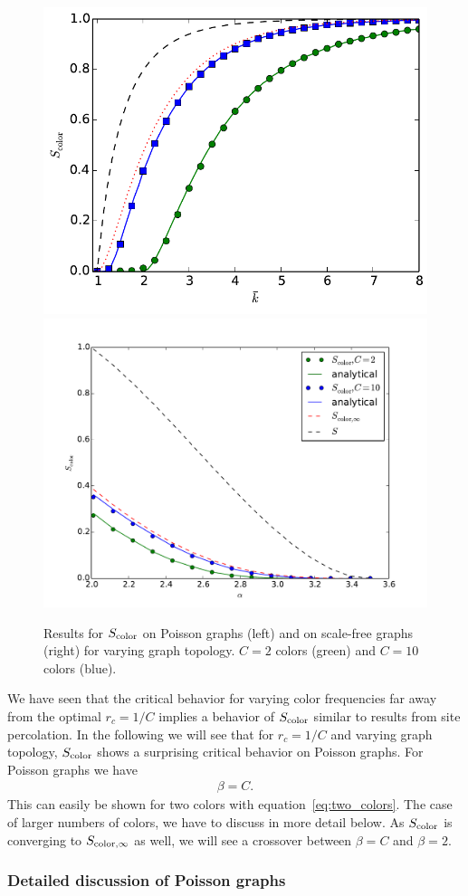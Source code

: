 \documentclass[aps, pre, onecolumn, a4paper, floatfix]{revtex4}
\begin{document}
\begin{figure}[htb]
    \includegraphics[width=0.45\columnwidth]{S_color_poisson.pdf}
    \includegraphics[width=0.53\columnwidth]{S_color_broad.pdf}\\
    \caption{Results for $S_{\rm color}$ on Poisson graphs (left) and 
    on scale-free graphs (right) for varying graph topology. 
    $C=2$ colors (green) and $C=10$ colors (blue).}
    \label{fig:decomposition}
\end{figure}
%
We have seen that the critical behavior for varying color frequencies 
far away from the optimal $r_c=1/C$ implies a behavior of $S_{\rm color}$ 
similar to results from site percolation. 
In the following we will see that for $r_c=1/C$ and varying graph topology, 
$S_{\rm color}$ shows a surprising critical behavior on Poisson graphs. 
For Poisson graphs we have 
\begin{align}
\beta=C.
\end{align}
This can easily be shown for two colors with equation~\ref{eq:two_colors}. 
The case of larger numbers of colors, we have to discuss in more detail below. 
As $S_{\rm color}$ is converging to $S_{\rm color,\infty}$ as well, 
we will see a crossover between $\beta=C$ and $\beta=2$.



\subsubsection{Detailed discussion of Poisson graphs}
\end{document}
